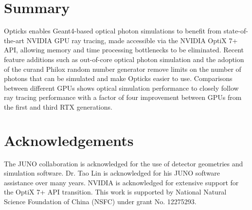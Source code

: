 \documentclass{webofc}
\begin{document}
\section{Summary}
%
Opticks enables Geant4-based optical photon simulations to benefit from 
state-of-the-art NVIDIA GPU ray tracing, made accessible via the NVIDIA OptiX 7+ API,
allowing memory and time processing bottlenecks to be eliminated. 
Recent feature additions such as out-of-core optical photon simulation and the 
adoption of the curand Philox random number generator remove limits on the number of 
photons that can be simulated and make Opticks easier to use. 
Comparisons between different GPUs shows optical simulation performance 
to closely follow ray tracing performance with a factor of four improvement between 
GPUs from the first and third RTX generations. 
%
%
\newpage
\section*{Acknowledgements}
%
The JUNO collaboration is acknowledged for the use of detector 
geometries and simulation software. Dr. Tao Lin is acknowledged 
for his JUNO software assistance over many years. NVIDIA is acknowledged for extensive 
support for the OptiX 7+ API transition.
%
This work is supported by National Natural Science Foundation of China (NSFC)
under grant No. 12275293.
%
\end{document}
